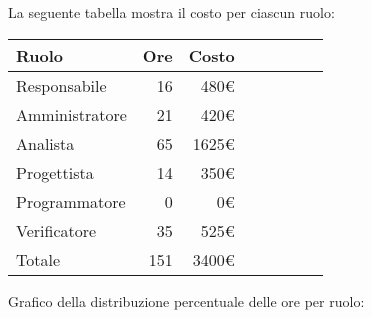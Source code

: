 La seguente tabella mostra il costo per ciascun ruolo:
\begin{table}[H]
    \begin{tabularx}{\linewidth}{X|rrrrrrr}
    \rowcolor{gray!30}Ruolo & Ore & Costo \\
    \hline
    Responsabile                            & 16 & 480€ \\
    \rowcolor{gray!10}Amministratore        & 21 & 420€ \\
    Analista                                & 65 & 1625€ \\
    \rowcolor{gray!10}Progettista           & 14 & 350€ \\
    Programmatore                           & 0 & 0€ \\
    \rowcolor{gray!10}Verificatore          & 35 & 525€ \\
    \hline Totale                           & 151 & 3400€ \\ 
    \end{tabularx}
\end{table}

Grafico della distribuzione percentuale delle ore per ruolo:
\begin{center}
\end{center}